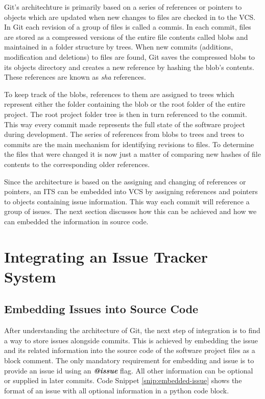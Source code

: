 \documentclass{mproj}
\begin{document}
Git's architechture is primarily based on a series of references or pointers to objects which are updated when new changes to files are checked in to the VCS. In Git each revision of a group of files is called a commis. In each commit, files are stored as a compressed versions of the entire file contents called blobs and maintained in a folder structure by trees. When new commits (additions, modification and deletions) to files are found, Git saves the compressed blobs to its objects directory and creates a new reference by hashing the blob's contents. These references are known as \textit{sha} references. 

To keep track of the blobs, references to them are assigned to trees which represent either the folder containing the blob or the root folder of the entire project.  The root project folder tree is then in turn referenced to the commit. This way every commit made represents the full state of the software project during development. The series of references from blobs to trees and trees to commits are the main mechanism for identifying revisions to files. To determine the files that were changed it is now just a matter of comparing new hashes of file contents to the corresponding older references.

Since the architecture is based on the assigning and changing of references or pointers, an ITS can be embedded into VCS by assigning references and pointers to objects containing issue information. This way each commit will reference a group of issues. The next section discusses how this can be achieved and how we can embedded the information in source code.





\section{Integrating an Issue Tracker System}


\subsection{Embedding Issues into Source Code}

After understanding the architecture of Git, the next step of integration is to find a way to store issues alongside commits. This is achieved by embedding the issue and its related information into the source code of the software project files as a block comment. The only mandatory requirement for embedding and issue is to provide an issue id using an \textbf{\textit{@issue}} flag. All other information can be optional or supplied in later commits. Code Snippet \ref{snip:embedded-issue} shows the format of an issue with all optional information in a python code block.
\end{document}
